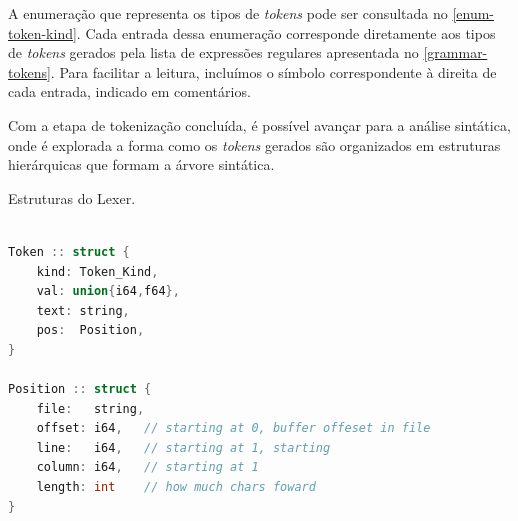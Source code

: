 A enumeração que representa os tipos de \textit{tokens} pode ser consultada no \autoref{enum-token-kind}. Cada entrada dessa enumeração corresponde diretamente aos tipos de \textit{tokens} gerados pela lista de expressões regulares apresentada no \autoref{grammar-tokens}. Para facilitar a leitura, incluímos o símbolo correspondente à direita de cada entrada, indicado em comentários.

Com a etapa de tokenização concluída, é possível avançar para a análise sintática, onde é explorada a forma como os \textit{tokens} gerados são organizados em estruturas hierárquicas que formam a árvore sintática.

\begin{codigo}[H]
        \caption{\small Estruturas do Lexer. }
        \label{lexer-structs}
\begin{lstlisting}[language=C++]

Token :: struct {
    kind: Token_Kind,
    val: union{i64,f64},
    text: string,
    pos:  Position,
}

Position :: struct {
    file:   string,
    offset: i64,   // starting at 0, buffer offeset in file
    line:   i64,   // starting at 1, starting
    column: i64,   // starting at 1
    length: int    // how much chars foward
}
    
  \end{lstlisting}
\end{codigo}




